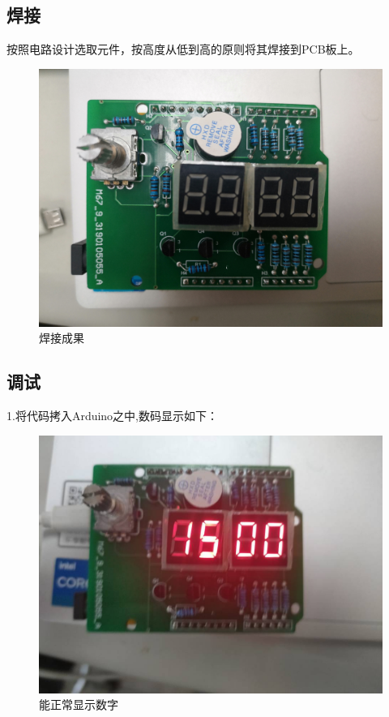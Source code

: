 \documentclass{../source/zjureport}
\begin{document}
        \subsection{焊接}
        按照电路设计选取元件，按高度从低到高的原则将其焊接到PCB板上。
        \newpage
        \begin{figure}[htp]
            \centering
            \includegraphics[scale = 0.09]{figures/焊接结果.jpg}
            \caption{焊接成果}
        \end{figure}

        \subsection{调试}
        1.将代码拷入Arduino之中,数码显示如下：
        \begin{figure}[!htp]
            \centering
            \includegraphics[scale = 0.28]{figures/数码显示.jpg}
            \caption{能正常显示数字}
        \end{figure}
\end{document}
